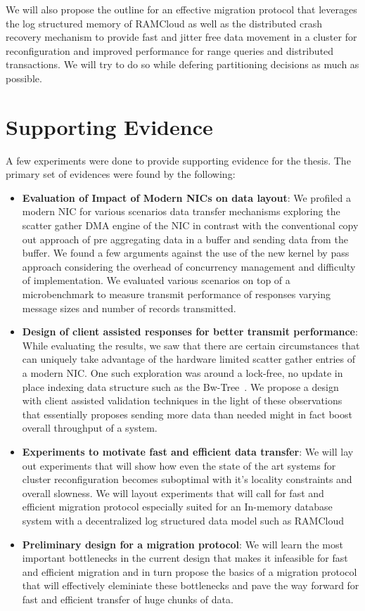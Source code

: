 We will also propose the outline for an effective migration protocol that leverages
the log structured memory of RAMCloud as well as the distributed crash recovery mechanism
to provide fast and jitter free data movement in a cluster for reconfiguration and improved 
performance for range queries and distributed transactions. We will try to do so while
defering partitioning decisions as much as possible.

\section{Supporting Evidence}
A few experiments were done to provide supporting evidence for the thesis. The primary set 
of evidences were found by the following:
\begin{itemize}
\item{\textbf{Evaluation of Impact of Modern NICs on data layout}}: We profiled a modern NIC for various 
scenarios data transfer mechanisms exploring the scatter gather DMA engine of the NIC in contrast
with the conventional copy out approach of pre aggregating data in a buffer and sending data from the buffer.
We found a few arguments against the use of the new kernel by pass approach considering the overhead
of concurrency management and difficulty of implementation. We evaluated various scenarios on top of a
microbenchmark to measure transmit performance of responses varying message sizes and number of records
transmitted.
\item{\textbf{Design of client assisted responses for better transmit performance}}: While evaluating the results,
we saw that there are certain circumstances that can uniquely take advantage of the hardware limited 
scatter gather entries of a modern NIC. One such exploration was around a lock-free, no update in place 
indexing data structure such as the Bw-Tree~\cite{bw-tree}. We propose a design with client assisted 
validation techniques in the light of these observations that essentially proposes sending more data than 
needed might in fact boost overall throughput of a system.
\item{\textbf{Experiments to motivate fast and efficient data transfer}}: We will lay out experiments that will 
show how even the state of the art systems for cluster reconfiguration becomes suboptimal with it's locality
constraints and overall slowness. We will layout experiments that will call for fast and efficient migration protocol
especially suited for an In-memory database system with a decentralized log structured data model such as RAMCloud
\item{\textbf{Preliminary design for a migration protocol}}: We will learn the most important bottlenecks in the current design
that makes it infeasible for fast and efficient migration and in turn propose the basics of a migration protocol that 
will effectively eleminiate these bottlenecks and pave the way forward for fast and efficient transfer of huge chunks of data.
\end{itemize}

